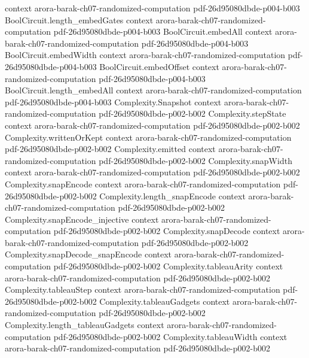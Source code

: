 \begin{theorem}
  {context}
  {arora-barak-ch07-randomized-computation}
  {pdf-26d95080dbde-p004-b003}
\proofstep
  {BoolCircuit.length_embedGates}
  {context}
  {arora-barak-ch07-randomized-computation}
  {pdf-26d95080dbde-p004-b003}
\proofstep
  {BoolCircuit.embedAll}
  {context}
  {arora-barak-ch07-randomized-computation}
  {pdf-26d95080dbde-p004-b003}
\proofstep
  {BoolCircuit.embedWidth}
  {context}
  {arora-barak-ch07-randomized-computation}
  {pdf-26d95080dbde-p004-b003}
\proofstep
  {BoolCircuit.embedOffset}
  {context}
  {arora-barak-ch07-randomized-computation}
  {pdf-26d95080dbde-p004-b003}
\proofstep
  {BoolCircuit.length_embedAll}
  {context}
  {arora-barak-ch07-randomized-computation}
  {pdf-26d95080dbde-p004-b003}
\proofstep
  {Complexity.Snapshot}
  {context}
  {arora-barak-ch07-randomized-computation}
  {pdf-26d95080dbde-p002-b002}
\proofstep
  {Complexity.stepState}
  {context}
  {arora-barak-ch07-randomized-computation}
  {pdf-26d95080dbde-p002-b002}
\proofstep
  {Complexity.writtenOrKept}
  {context}
  {arora-barak-ch07-randomized-computation}
  {pdf-26d95080dbde-p002-b002}
\proofstep
  {Complexity.emitted}
  {context}
  {arora-barak-ch07-randomized-computation}
  {pdf-26d95080dbde-p002-b002}
\proofstep
  {Complexity.snapWidth}
  {context}
  {arora-barak-ch07-randomized-computation}
  {pdf-26d95080dbde-p002-b002}
\proofstep
  {Complexity.snapEncode}
  {context}
  {arora-barak-ch07-randomized-computation}
  {pdf-26d95080dbde-p002-b002}
\proofstep
  {Complexity.length_snapEncode}
  {context}
  {arora-barak-ch07-randomized-computation}
  {pdf-26d95080dbde-p002-b002}
\proofstep
  {Complexity.snapEncode_injective}
  {context}
  {arora-barak-ch07-randomized-computation}
  {pdf-26d95080dbde-p002-b002}
\proofstep
  {Complexity.snapDecode}
  {context}
  {arora-barak-ch07-randomized-computation}
  {pdf-26d95080dbde-p002-b002}
\proofstep
  {Complexity.snapDecode_snapEncode}
  {context}
  {arora-barak-ch07-randomized-computation}
  {pdf-26d95080dbde-p002-b002}
\proofstep
  {Complexity.tableauArity}
  {context}
  {arora-barak-ch07-randomized-computation}
  {pdf-26d95080dbde-p002-b002}
\proofstep
  {Complexity.tableauStep}
  {context}
  {arora-barak-ch07-randomized-computation}
  {pdf-26d95080dbde-p002-b002}
\proofstep
  {Complexity.tableauGadgets}
  {context}
  {arora-barak-ch07-randomized-computation}
  {pdf-26d95080dbde-p002-b002}
\proofstep
  {Complexity.length_tableauGadgets}
  {context}
  {arora-barak-ch07-randomized-computation}
  {pdf-26d95080dbde-p002-b002}
\proofstep
  {Complexity.tableauWidth}
  {context}
  {arora-barak-ch07-randomized-computation}
  {pdf-26d95080dbde-p002-b002}

\end{theorem}
